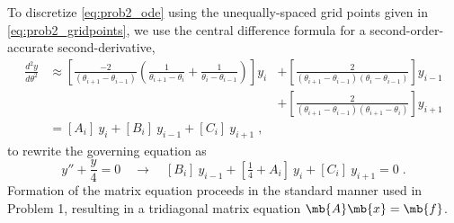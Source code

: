 \documentclass[11pt]{article}
\begin{document}
To discretize \eqref{eq:prob2_ode} using the unequally-spaced grid points given in \eqref{eq:prob2_gridpoints}, we use the central difference formula for a second-order-accurate second-derivative,
\begin{equation}
\begin{aligned}
\frac{d^2 y}{d \theta^2}
&\approx
\left[
\frac{-2}{(\theta_{i+1} - \theta_{i-1})}
\left(
\frac{1}{\theta_{i+1} - \theta_i}
+
\frac{1}{\theta_i - \theta_{i-1}}
\right)
\right] y_i
\!\!\!\!
&+\left[
\frac{2}{(\theta_{i+1} - \theta_{i-1})(\theta_i - \theta_{i-1})}
\right] y_{i-1}
\\
&&+\left[
\frac{2}{(\theta_{i+1} - \theta_{i-1})(\theta_{i+1} - \theta_{i})}
\right] y_{i+1}
\\
&=
[A_i] \: y_i + [B_i] \: y_{i-1} + [C_i] \: y_{i+1}
\;,
\end{aligned}
\end{equation}
to rewrite the governing equation as
\begin{equation}
y'' + \frac{y}{4} = 0
\quad \rightarrow \quad
[B_i] \: y_{i-1} + [\tfrac{1}{4} + A_i] \: y_i + [C_i] \: y_{i+1} = 0
\;.
\end{equation}
Formation of the matrix equation proceeds in the standard manner used in Problem 1, resulting in a tridiagonal matrix equation $\mb{A} \mb{x} = \mb{f}$.
\end{document}
